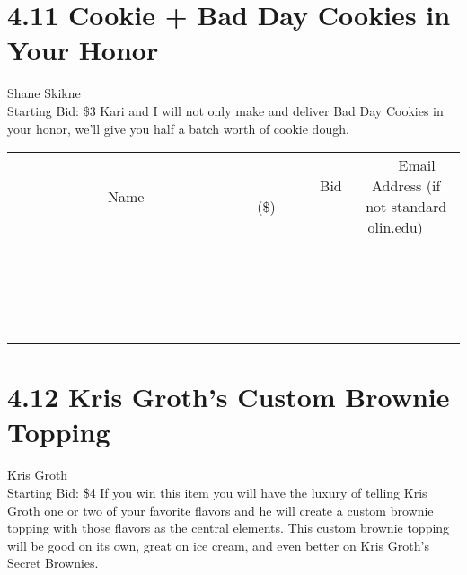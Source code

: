 \documentclass[11pt]{article}
\begin{document}
\section*{4.11 Cookie + Bad Day Cookies in Your Honor}
Shane Skikne
\\
Starting Bid: \$3
\newline
Kari and I will not only make and deliver Bad Day Cookies in your honor, we'll give you half a batch worth of cookie dough.
\\[3ex]
\begin{tabular}{c c c}
~~~~~~~~~~~~~Name~~~~~~~~~~~~~ & ~~~~~~~~~Bid (\$)~~~~~~~~~  & ~~~Email Address (if not standard olin.edu)~~~\\
 & & \\
\hline
 & & \\
\hline
 & & \\
\hline
 & & \\
\hline
 & & \\
\hline
 & & \\
\hline
 & & \\
\hline
 & & \\
\hline
 & & \\
\hline
 & & \\
\hline
 & & \\
\hline
 & & \\
\hline
 & & \\
\hline
 & & \\
\hline
 & & \\
\hline
 & & \\
\hline
 & & \\
\hline
 & & \\
\hline
 & & \\
\hline
\end{tabular}
\newpage
\section*{4.12 Kris Groth's Custom Brownie Topping}
Kris Groth
\\
Starting Bid: \$4
\newline
If you win this item you will have the luxury of telling Kris Groth one or two of your favorite flavors and he will create a custom brownie topping with those flavors as the central elements. This custom brownie topping will be good on its own, great on ice cream, and even better on Kris Groth's Secret Brownies.
\end{document}
